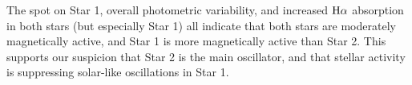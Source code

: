 The spot on Star 1, overall photometric variability, and increased $\rm{H}\alpha$ absorption in both stars (but especially Star 1) all indicate that both stars are moderately magnetically active, and Star 1 is more magnetically active than Star 2. This supports our suspicion that Star 2 is the main oscillator, and that stellar activity is suppressing solar-like oscillations in Star 1.
